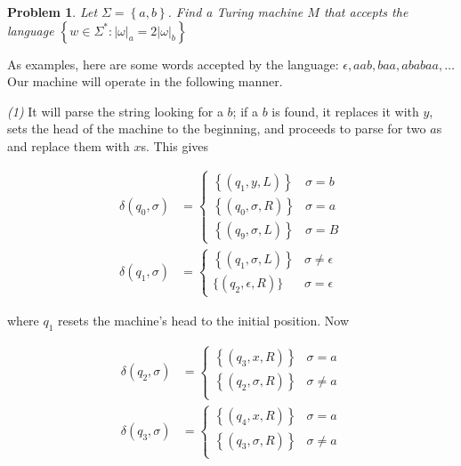 \documentclass[a4paper, 12pt]{article}
\newtheorem{problem}{Problem}
\newtheorem{problem}{Problem}
\begin{document}
\begin{problem}
    Let $\Sigma = \left\{ a, b \right\} $. Find a Turing machine $M$ that
    accepts the language $ \left\{ w \in \Sigma^{*} : |\omega|_a = 2|\omega|_b
    \right\} $
\end{problem}

As examples, here are some words accepted by the language: $\epsilon, aab, baa,
ababaa, \ldots$ Our machine will operate in the following manner.

\textit{(1)} It will parse the string looking for a $b$; if a $b$ is found, it
replaces it with $y$, sets the head of the machine to the beginning, and
proceeds to parse for two $a$s and replace them with $x$s. This gives 

\begin{align*}
    \delta(q_0, \sigma) &= \begin{cases}
        \left\{ \left( q_1, y, L \right)  \right\} & \sigma = b\\
        \left\{ \left( q_0, \sigma, R \right)  \right\} & \sigma = a\\
        \left\{ \left( q_9, \sigma, L \right)  \right\} & \sigma = B
    \end{cases} \\
    \delta(q_1, \sigma) &= \begin{cases}
        \left\{ \left( q_1, \sigma, L \right)  \right\} & \sigma \neq \epsilon
        \\ 
        \{ (q_2, \epsilon, R) \} & \sigma = \epsilon
    \end{cases}
\end{align*}

where $q_1$ resets the machine's head to the initial position. Now 

\begin{align*}
    \delta(q_2, \sigma) &= \begin{cases}
        \left\{ (q_3, x, R) \right\}  & \sigma = a \\ 
        \left\{ (q_2, \sigma, R) \right\}  & \sigma \neq a \\ 
    \end{cases}\\
    \delta(q_3, \sigma) &= \begin{cases}
        \left\{ (q_4, x, R) \right\}  & \sigma = a \\ 
        \left\{ (q_3, \sigma, R) \right\}  & \sigma \neq a \\ 
    \end{cases}
\end{align*}
\end{document}
